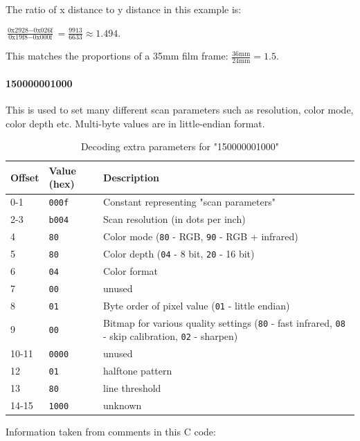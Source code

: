 \documentclass{article}
\begin{document}
The ratio of x distance to y distance in this example is:

$\frac{\textrm{0x2928} - \textrm{0x026f}}{\textrm{0x19f8} - \textrm{0x000f}} = \frac{9913}{6633} \approx 1.494$.

This matches the proportions of a 35mm film frame: $\frac{36 \textrm{mm}}{24 \textrm{mm}} = 1.5$.

\paragraph{150000001000} This is used to set many different scan parameters
such as resolution, color mode, color depth etc. Multi-byte
values are in little-endian format.

\begin{table}[H]
  \caption{Decoding extra parameters for "150000001000"}
  \centering
  \begin{tabular}{p{1cm} | p{1cm} | p{7cm}}
    Offset & Value (hex) & Description \\ \hline
    0-1 & {\tt 000f} & Constant representing "scan parameters" \\
    2-3 & {\tt b004} & Scan resolution (in dots per inch) \\
    4 & {\tt 80} & Color mode ({\tt 80} - RGB, {\tt 90} - RGB + infrared) \\
    5 & {\tt 80} & Color depth ({\tt 04} - 8 bit, {\tt 20} - 16 bit) \\
    6 & {\tt 04} & Color format \\
    7 & {\tt 00} & unused \\
    8 & {\tt 01} & Byte order of pixel value ({\tt 01} - little endian) \\
    9 & {\tt 00} & Bitmap for various quality settings ({\tt 80} - fast infrared,
                                                        {\tt 08} - skip calibration,
                                                        {\tt 02} - sharpen) \\
    10-11 & {\tt 0000} & unused \\
    12 & {\tt 01} & halftone pattern \\
    13 & {\tt 80} & line threshold \\
    14-15 & {\tt 1000} & unknown \\
  \end{tabular}
  
  \vspace{5mm}
  Information taken from comments in this C code: \cite[\texttt{pieusb\_scancmd.c}]{sane_code}
  \label{table:param15}
\end{table}
\end{document}
